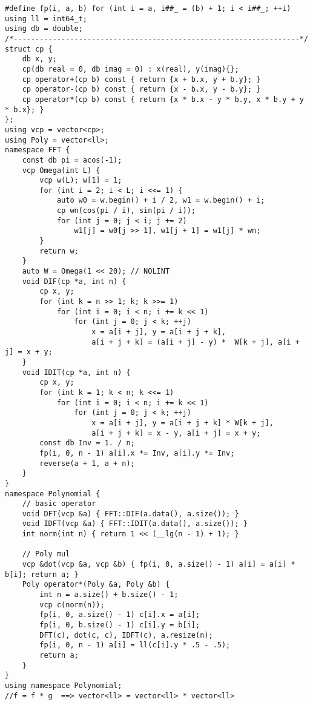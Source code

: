 \documentclass[]{article}
\begin{document}
\begin{verbatim}
#define fp(i, a, b) for (int i = a, i##_ = (b) + 1; i < i##_; ++i)
using ll = int64_t;
using db = double;
/*------------------------------------------------------------------*/
struct cp {
    db x, y;
    cp(db real = 0, db imag = 0) : x(real), y(imag){};
    cp operator+(cp b) const { return {x + b.x, y + b.y}; }
    cp operator-(cp b) const { return {x - b.x, y - b.y}; }
    cp operator*(cp b) const { return {x * b.x - y * b.y, x * b.y + y * b.x}; }
};
using vcp = vector<cp>;
using Poly = vector<ll>;
namespace FFT {
    const db pi = acos(-1);
    vcp Omega(int L) {
        vcp w(L); w[1] = 1;
        for (int i = 2; i < L; i <<= 1) {
            auto w0 = w.begin() + i / 2, w1 = w.begin() + i;
            cp wn(cos(pi / i), sin(pi / i));
            for (int j = 0; j < i; j += 2)
                w1[j] = w0[j >> 1], w1[j + 1] = w1[j] * wn;
        }
        return w;
    }
    auto W = Omega(1 << 20); // NOLINT
    void DIF(cp *a, int n) {
        cp x, y;
        for (int k = n >> 1; k; k >>= 1)
            for (int i = 0; i < n; i += k << 1)
                for (int j = 0; j < k; ++j)
                    x = a[i + j], y = a[i + j + k],
                    a[i + j + k] = (a[i + j] - y) *  W[k + j], a[i + j] = x + y;
    }
    void IDIT(cp *a, int n) {
        cp x, y;
        for (int k = 1; k < n; k <<= 1)
            for (int i = 0; i < n; i += k << 1)
                for (int j = 0; j < k; ++j)
                    x = a[i + j], y = a[i + j + k] * W[k + j],
                    a[i + j + k] = x - y, a[i + j] = x + y;
        const db Inv = 1. / n;
        fp(i, 0, n - 1) a[i].x *= Inv, a[i].y *= Inv;
        reverse(a + 1, a + n);
    }
}
namespace Polynomial {
    // basic operator
    void DFT(vcp &a) { FFT::DIF(a.data(), a.size()); }
    void IDFT(vcp &a) { FFT::IDIT(a.data(), a.size()); }
    int norm(int n) { return 1 << (__lg(n - 1) + 1); }
    
    // Poly mul
    vcp &dot(vcp &a, vcp &b) { fp(i, 0, a.size() - 1) a[i] = a[i] * b[i]; return a; }
    Poly operator*(Poly &a, Poly &b) {
        int n = a.size() + b.size() - 1;
        vcp c(norm(n));
        fp(i, 0, a.size() - 1) c[i].x = a[i];
        fp(i, 0, b.size() - 1) c[i].y = b[i];
        DFT(c), dot(c, c), IDFT(c), a.resize(n);
        fp(i, 0, n - 1) a[i] = ll(c[i].y * .5 - .5);
        return a;
    }
}
using namespace Polynomial;
//f = f * g  ==> vector<ll> = vector<ll> * vector<ll>
\end{verbatim}
\end{document}
